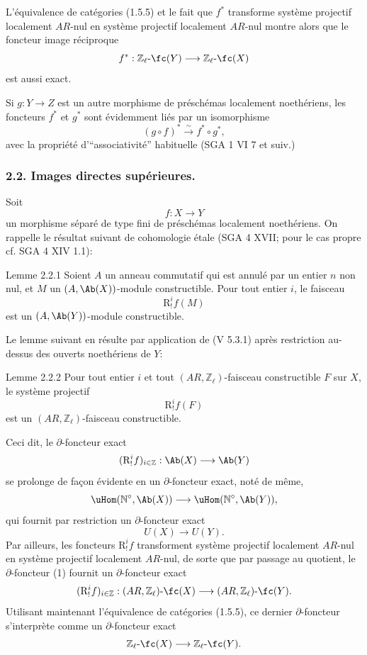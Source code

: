 L'équivalence de catégories (1.5.5) et le fait que \(f^*\) transforme système projectif localement \(AR\)-nul en système projectif localement \(AR\)-nul montre alors que le foncteur image réciproque
\[
f^*:\mathbb{Z}_\ell\text{-}\fc(Y)\longrightarrow \mathbb{Z}_\ell\text{-}\fc(X)
\]
est aussi exact.

Si \(g:Y\to Z\) est un autre morphisme de préschémas localement noethériens, les foncteurs \(f^*\) et \(g^*\) sont évidemment liés par un isomorphisme
\[
(g\circ f)^*\xrightarrow{\sim}f^*\circ g^*,
\]
avec la propriété d'``associativité'' habituelle (SGA 1 VI 7 et suiv.)

\subsubsection*{2.2. Images directes supérieures.}

Soit
\[
f:X\longrightarrow Y
\]
un morphisme séparé de type fini de préschémas localement noethériens. On rappelle le résultat suivant de cohomologie étale (SGA 4 XVII; pour le cas propre cf. SGA 4 XIV 1.1):

\begin{statement}{Lemme 2.2.1}
Soient \(A\) un anneau commutatif qui est annulé par un entier \(n\) non nul, et \(M\) un \((A,\Ab(X))\)-module constructible. Pour tout entier \(i\), le faisceau
\[
\mathrm{R}^i_!f(M)
\]
est un \((A,\Ab(Y))\)-module constructible.
\end{statement}

Le lemme suivant en résulte par application de (V 5.3.1) après restriction au-dessus des ouverts noethériens de \(Y\):

\begin{statement}{Lemme 2.2.2}
Pour tout entier \(i\) et tout \((AR,\mathbb{Z}_\ell)\)-faisceau constructible \(F\) sur \(X\), le système projectif
\[
\mathrm{R}^i_!f(F)
\]
est un \((AR,\mathbb{Z}_\ell)\)-faisceau constructible.
\end{statement}

Ceci dit, le \(\partial\)-foncteur exact
\[
(\mathrm{R}^i_!f)_{i\in\mathbb{Z}}:\Ab(X)\longrightarrow \Ab(Y)
\]
se prolonge de façon évidente en un \(\partial\)-foncteur exact, noté de même,
\[
\uHom(\mathbb{N}^\circ,\Ab(X))\longrightarrow \uHom(\mathbb{N}^\circ,\Ab(Y)),
\]
qui fournit par restriction un \(\partial\)-foncteur exact
\[
U(X)\longrightarrow U(Y).
\tag{1}
\]
Par ailleurs, les foncteurs \(\mathrm{R}^i_!f\) transforment système projectif localement \(AR\)-nul en système projectif localement \(AR\)-nul, de sorte que par passage au
quotient, le \(\partial\)-foncteur (1) fournit un \(\partial\)-foncteur exact\[
(\mathrm{R}^i_!f)_{i\in\mathbb{Z}}:(AR,\mathbb{Z}_\ell)\text{-}\fc(X)
\longrightarrow (AR,\mathbb{Z}_\ell)\text{-}\fc(Y).
\]
Utilisant maintenant l'équivalence de catégories (1.5.5), ce dernier \(\partial\)-foncteur s'interprète comme un \(\partial\)-foncteur exact
\[
\mathbb{Z}_\ell\text{-}\fc(X)\longrightarrow \mathbb{Z}_\ell\text{-}\fc(Y).
\]


